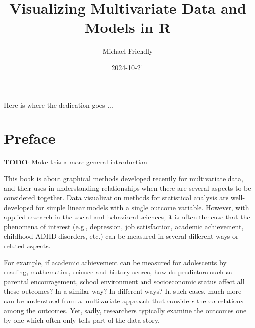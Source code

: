 \documentclass[
  letterpaper,
  10pt,
  krantz2]{krantz}
\title{Visualizing Multivariate Data and Models in R}
\author{Michael Friendly}
\date{2024-10-21}
\renewcommand*\contentsname{Table of contents}
\newcommand\contentsname{Table of contents}
\begin{document}
\maketitle


\thispagestyle{empty}

\begin{center}
Here is where the dedication goes ...
\end{center}

\setlength{\abovedisplayskip}{-5pt}
\setlength{\abovedisplayshortskip}{-5pt}


\renewcommand*\contentsname{Table of contents}
{
\hypersetup{linkcolor=}
\setcounter{tocdepth}{2}
\tableofcontents
}

\chapter*{Preface}\label{preface}


\textbf{TODO}: Make this a more general introduction

This book is about graphical methods developed recently for multivariate
data, and their uses in understanding relationships when there are
several aspects to be considered together. Data visualization methods
for statistical analysis are well-developed for simple linear models
with a single outcome variable. However, with applied research in the
social and behavioral sciences, it is often the case that the phenomena
of interest (e.g., depression, job satisfaction, academic achievement,
childhood ADHD disorders, etc.) can be measured in several different
ways or related aspects.

For example, if academic achievement can be measured for adolescents by
reading, mathematics, science and history scores, how do predictors such
as parental encouragement, school environment and socioeconomic status
affect all these outcomes? In a similar way? In different ways? In such
cases, much more can be understood from a multivariate approach that
considers the correlations among the outcomes. Yet, sadly, researchers
typically examine the outcomes one by one which often only tells part of
the data story.
\end{document}
